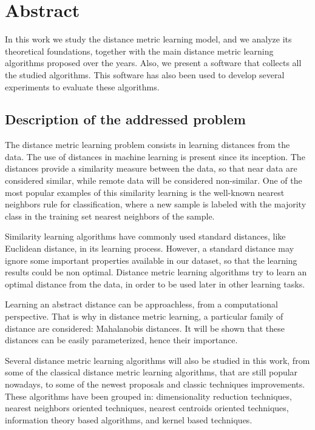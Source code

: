 
\chapter*{Abstract}

In this work we study the distance metric learning model, and we analyze its theoretical foundations, together with the main distance metric learning algorithms proposed over the years. Also, we present a software that collects all the studied algorithms. This software has also been used to develop several experiments to evaluate these algorithms.

\section*{Description of the addressed problem}

The distance metric learning problem consists in learning distances from the data. The use of distances in machine learning is present since its inception. The distances provide a similarity measure between the data, so that near data are considered similar, while remote data will be considered non-similar. One of the most popular examples of this similarity learning is the well-known nearest neighbors rule for classification, where a new sample is labeled with the majority class in the training set nearest neighbors of the sample.

Similarity learning algorithms have commonly used standard distances, like Euclidean distance, in its learning process. However, a standard distance may ignore some important properties available in our dataset, so that the learning results could be non optimal. Distance metric learning algorithms try to learn an optimal distance from the data, in order to be used later in other learning tasks.

Learning an abstract distance can be approachless, from a computational perspective. That is why in distance metric learning, a particular family of distance are considered: Mahalanobis distances. It will be shown that these distances can be easily parameterized, hence their importance.

Several distance metric learning algorithms will also be studied in this work, from some of the classical distance metric learning algorithms, that are still popular nowadays, to some of the newest proposals and classic techniques improvements. These algorithms have been grouped in: dimensionality reduction techniques, nearest neighbors oriented techniques, nearest centroids oriented techniques, information theory based algorithms, and kernel based techniques.

